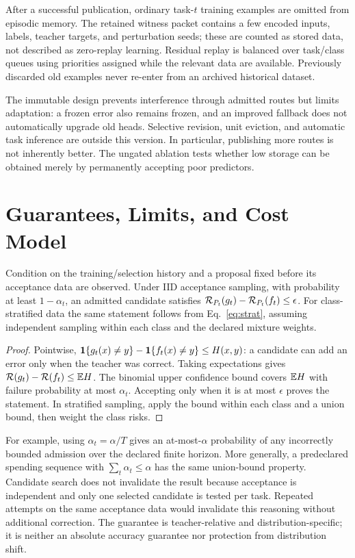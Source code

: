 \documentclass{article}
\begin{document}
After a successful publication, ordinary task-$t$ training examples are omitted from episodic memory. The retained witness packet contains a few encoded inputs, labels, teacher targets, and perturbation seeds; these are counted as stored data, not described as zero-replay learning. Residual replay is balanced over task/class queues using priorities assigned while the relevant data are available. Previously discarded old examples never re-enter from an archived historical dataset.

The immutable design prevents interference through admitted routes but limits adaptation: a frozen error also remains frozen, and an improved fallback does not automatically upgrade old heads. Selective revision, unit eviction, and automatic task inference are outside this version. In particular, publishing more routes is not inherently better. The ungated ablation tests whether low storage can be obtained merely by permanently accepting poor predictors.

\section{Guarantees, Limits, and Cost Model}
\label{sec:analysis}
\begin{proposition}
Condition on the training/selection history and a proposal fixed before its acceptance data are observed. Under IID acceptance sampling, with probability at least $1-\alpha_t$, an admitted candidate satisfies
$\mathcal{R}_{P_t}(g_t)-\mathcal{R}_{P_t}(f_t)\le\epsilon$.
For class-stratified data the same statement follows from Eq.~\eqref{eq:strat}, assuming independent sampling within each class and the declared mixture weights.
\end{proposition}
\begin{proof}
Pointwise, $\mathbf{1}\{g_t(x)\ne y\}-\mathbf{1}\{f_t(x)\ne y\}\le H(x,y)$: a candidate can add an error only when the teacher was correct. Taking expectations gives $\mathcal{R}(g_t)-\mathcal{R}(f_t)\le\mathbb{E} H$. The binomial upper confidence bound covers $\mathbb{E} H$ with failure probability at most $\alpha_t$. Accepting only when it is at most $\epsilon$ proves the statement. In stratified sampling, apply the bound within each class and a union bound, then weight the class risks.\end{proof}
For example, using $\alpha_t=\alpha/T$ gives an at-most-$\alpha$ probability of any incorrectly bounded admission over the declared finite horizon. More generally, a predeclared spending sequence with $\sum_t\alpha_t\le\alpha$ has the same union-bound property. Candidate search does not invalidate the result because acceptance is independent and only one selected candidate is tested per task. Repeated attempts on the same acceptance data would invalidate this reasoning without additional correction. The guarantee is teacher-relative and distribution-specific; it is neither an absolute accuracy guarantee nor protection from distribution shift.
\end{document}
